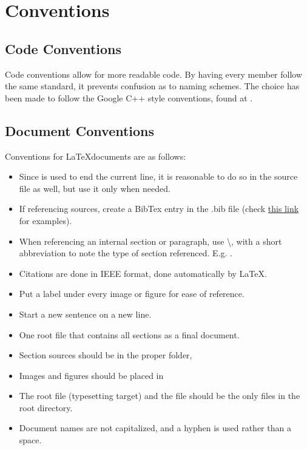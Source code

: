 \section{Conventions}
\subsection{Code Conventions}
\label{app::codecon}
Code conventions allow for more readable code.
By having every member follow the same standard, it prevents confusion as to naming schemes.
The choice has been made to follow the Google C++ style conventions, found at \href{https://google.github.io/styleguide/cppguide.html}{\cite{cppstyle}}.

\subsection{Document Conventions}
Conventions for \LaTeX documents are as follows:
\begin{itemize}
\item Since \code{\textbackslash\textbackslash} is used to end the current line, it is reasonable to do so in the source file as well, but use it only when needed.
\item If referencing sources, create a BibTex entry in the .bib file (check \href{https://en.wikibooks.org/wiki/LaTeX/Bibliography_Management#A_few_additional_examples}{this link} for examples).
\item When referencing an internal section or paragraph, use \textbackslash {}, with a short abbreviation to note the type of section referenced. E.g. .
\item Citations are done in IEEE format, done automatically by \LaTeX.
\item Put a label under every image or figure for ease of reference.
\item Start a new sentence on a new line.
\item One root file that contains all sections as a final document.
\item Section sources should be in the proper folder, 
\item Images and figures should be placed in 
\item The root file (typesetting target) and the  file should be the only files in the root directory.
\item Document names are not capitalized, and a hyphen is used rather than a space.
\end{itemize}


